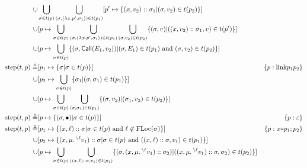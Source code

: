 \documentclass{article}
\begin{document}
\begin{align*}
  \cup                       & \bigcup_{\sigma\in t(p)}\bigcup_{(\sigma,\langle\lambda x.p',\sigma_1\rangle)\in t(p_1)}[p'\mapsto\{(x,v_2)::\sigma_1|(\sigma,v_2)\in t(p_2)\}]                                                                                                                  \\
  \cup                       & [p\mapsto\bigcup_{\sigma\in t(p)}\bigcup_{(\sigma,\langle\lambda x.p',\sigma_1\rangle)\in t(p_1)}\bigcup_{(\sigma,v_2)\in t(p_2)}\{(\sigma,v)|((x,v_2)::\sigma_1,v)\in t(p')\}]                                                                               \\
  \cup                       & [p\mapsto\bigcup_{\sigma\in t(p)}\{(\sigma,\textsf{Call}(E_1,v_2))|(\sigma,E_1)\in t(p_1)\text{ and }(\sigma,v_2)\in t(p_2)\}]                                                                                                                                 \\
  \text{step}(t,p) \triangleq & [p_1\mapsto\{\sigma|\sigma\in t(p)\}]                                                                                                                                                                & \{{p}:{\text{link}{p_1}{p_2}}\}                                      \\
  \cup                       & [p_2\mapsto\bigcup_{\sigma\in t(p)}\{\sigma_1|(\sigma,\sigma_1)\in t(p_1)\}]                                                                                                                                                                                           \\
  \cup                       & [p\mapsto\bigcup_{\sigma\in t(p)}\bigcup_{(\sigma,\sigma_1)\in t(p_1)}\{(\sigma,v_2)|(\sigma_1,v_2)\in t(p_2)\}]                                                                                                                                                    \\
  \text{step}(t,p) \triangleq & [p\mapsto\{(\sigma,\bullet)|\sigma\in t(p)\}]                                                                                                                                                        & \{{p}:{\varepsilon}\}                                          \\
  \text{step}(t,p) \triangleq & [p_1\mapsto\{(x,\ell)::\sigma|\sigma\in t(p)\text{ and }\ell\not\in\text{FLoc}(\sigma)\}]                                                                                                                 & \{{p}:{x\texttt{=}p_1;p_2}\}                                   \\
  \cup                       & [p_2\mapsto\{(x,\mu.\prescript{\backslash{\ell}}{}{v_1})::\sigma|\sigma\in t(p)\text{ and }((x,\ell)::\sigma,v_1)\in t(p_1)\}]                                                                                                                                                \\
  \cup                       & [p\mapsto\bigcup_{\sigma\in t(p)}\bigcup_{((x,\ell)::\sigma,v_1)\in t(p_1)}\{(\sigma,(x,\mu.\prescript{\backslash{\ell}}{}{v_1})::\sigma_2)|((x,\mu.\prescript{\backslash{\ell}}{}{v_1})::\sigma,\sigma_2)\in t(p_2)\}]
\end{align*}
\end{document}
